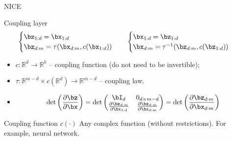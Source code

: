 \begin{frame}{NICE}
	\begin{block}{Coupling layer}
		\vspace{-0.5cm}
		\begin{equation*}
			\begin{cases} \bz_{1:d} = \bx_{1:d} \\ \bz_{d:m} = \tau (\bx_{d:m}, c(\bx_{1:d}))\end{cases} \quad 
			\begin{cases} \bx_{1:d} = \bz_{1:d} \\ \bx_{d:m} = \tau^{-1} (\bz_{d:m}, c(\bz_{1:d}))\end{cases}
		\end{equation*}
		\vspace{-0.3cm}
		\begin{itemize}
			\item $c: \mathbb{R}^d \rightarrow \mathbb{R}^{k}$ -- coupling function (do not need to be invertible);
			\item $\tau : \mathbb{R}^{m - d} \times c(\mathbb{R}^d) \rightarrow \mathbb{R}^{m - d}$ -- coupling law.
			\item 
			\[
			\det \left( \frac{\partial \bz}{\partial \bx} \right) = \det 
			\begin{pmatrix}
				\bI_d & 0_{d \times m - d} \\
				\frac{\partial \bz_{d:m}}{\partial \bx_{1:d}} & \frac{\partial \bz_{d:m}}{\partial \bx_{d:m}}
			\end{pmatrix} = 
			\det \left( \frac{\partial \bz_{d:m}}{\partial \bx_{d:m}} \right)
			\]
		\end{itemize}
	\end{block}
	\vspace{-0.3cm}
	\begin{block}{Coupling function $c(\cdot)$}
		Any complex function (without restrictions). For example, neural network.
	\end{block}
\end{frame}
